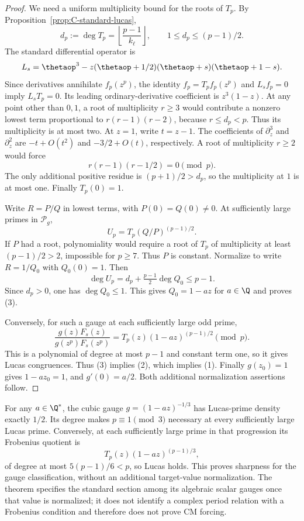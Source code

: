 \begin{proof}
We need a uniform multiplicity bound for the roots of $T_p$.
By Proposition~\ref{prop:C-standard-lucas},
\[
 d_p:=\deg T_p=\left\lfloor\frac{p-1}{k_\ell}\right\rfloor,
 \qquad 1\leq d_p\leq(p-1)/2.
\]
The standard differential operator is
\[
 L_s=\thetaop^3-z(\thetaop+1/2)(\thetaop+s)(\thetaop+1-s).
\]
Since derivatives annihilate $f_p(z^p)$, the identity
$f_p=T_pf_p(z^p)$ and $L_sf_p=0$ imply $L_sT_p=0$.
Its leading ordinary-derivative coefficient is $z^3(1-z)$.
At any point other than $0,1$, a root of multiplicity $r\geq3$
would contribute a nonzero lowest term proportional to
$r(r-1)(r-2)$, because $r\leq d_p<p$. Thus its multiplicity
is at most two. At $z=1$, write $t=z-1$.
The coefficients of $\partial_z^3$ and $\partial_z^2$ are
$-t+O(t^2)$ and $-3/2+O(t)$, respectively.
A root of multiplicity $r\geq2$ would force
\[
                         r(r-1)(r-1/2)=0\pmod p.
\]
The only additional positive residue is $(p+1)/2>d_p$, so the
multiplicity at $1$ is at most one. Finally $T_p(0)=1$.

Write $R=P/Q$ in lowest terms, with $P(0)=Q(0)\ne0$.
At sufficiently large primes in $\mathcal P_g$,
\[
                       U_p=T_p(Q/P)^{(p-1)/2}.
\]
If $P$ had a root, polynomiality would require a root of $T_p$
of multiplicity at least $(p-1)/2>2$, impossible for $p\geq7$.
Thus $P$ is constant. Normalize to write $R=1/Q_0$ with $Q_0(0)=1$.
Then
\[
 \deg U_p=d_p+\tfrac{p-1}{2}\deg Q_0\leq p-1.
\]
Since $d_p>0$, one has $\deg Q_0\leq1$.
This gives $Q_0=1-az$ for $a\in\Q$ and proves (3).

Conversely, for such a gauge at each sufficiently large odd prime,
\[
 \frac{g(z)F_s(z)}{g(z^p)F_s(z^p)}
       =T_p(z)(1-az)^{(p-1)/2}\pmod p.
\]
This is a polynomial of degree at most $p-1$ and constant term one,
so it gives Lucas congruences. Thus (3) implies (2), which implies (1).
Finally $g(z_0)=1$ gives $1-az_0=1$, and $g'(0)=a/2$.
Both additional normalization assertions follow.
\end{proof}

\begin{remark}
For any $a\in\Q^*$, the cubic gauge $g=(1-az)^{-1/3}$ has
Lucas-prime density exactly $1/2$. Its degree makes $p\equiv1\pmod3$
necessary at every sufficiently large Lucas prime. Conversely, at
each sufficiently large prime in that progression its Frobenius
quotient is
\[
                  T_p(z)(1-az)^{(p-1)/3},
\]
of degree at most $5(p-1)/6<p$, so Lucas holds.
This proves sharpness for the gauge classification, without an
additional target-value normalization. The theorem specifies the
standard section among its algebraic scalar gauges once that value
is normalized; it does not identify a complex period relation with
a Frobenius condition and therefore does not prove CM forcing.
\end{remark}

